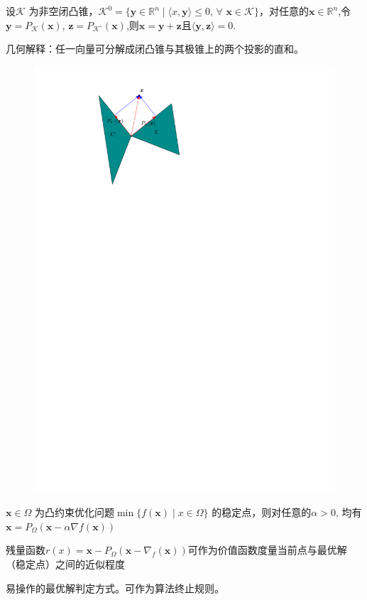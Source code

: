 \begin{theorem}[Moreau分解定理]
   设$\mathcal{K}$ 为非空闭凸锥，$\mathcal{K} ^0= \{ \boldsymbol{y}\in \mathbb{R} ^n\mid \langle x, \boldsymbol{y}\rangle \leqslant 0$, $\forall$ $\boldsymbol{x}\in \mathcal{K} \}$，对任意的$\boldsymbol{x}\in\mathbb{R}^n$,令 $\boldsymbol{y}= P_{\mathcal{K} }( \boldsymbol{x})$, $\boldsymbol{z}= P_{\mathcal{K} ^{\circ }}( \boldsymbol{x})$,则$\boldsymbol{x}=\boldsymbol{y}+\boldsymbol{z}$且$\langle \boldsymbol{y},\boldsymbol{z}\rangle=0.$

   \colorbox{red!50}{几何解释：任一向量可分解成闭凸锥与其极锥上的两个投影的直和。}
   \begin{figure}[ht]
        \centering
        \includegraphics{image/闭凸锥上的投影分解.pdf}
   \end{figure}
\end{theorem}
\begin{theorem}
    $\boldsymbol{x}\in \Omega$ 为凸约束优化问题$\min\{f(\boldsymbol{x})\mid x\in\Omega\}$ 的稳定点，则对任意的$\alpha>0$, 均有 $\boldsymbol{x}=P_\Omega(\boldsymbol{x}-\alpha\nabla f(\boldsymbol{x}))$
    
    \textcolor{red!80}{残量函数$r(x)=\boldsymbol{x}-P_\Omega(\boldsymbol{x}-\nabla_f(\boldsymbol{x}))$可作为价值函数度量当前点与最优解（稳定点）之间的近似程度}

    \textcolor{cyan!80}{易操作的最优解判定方式。可作为算法终止规则。}
\end{theorem}
